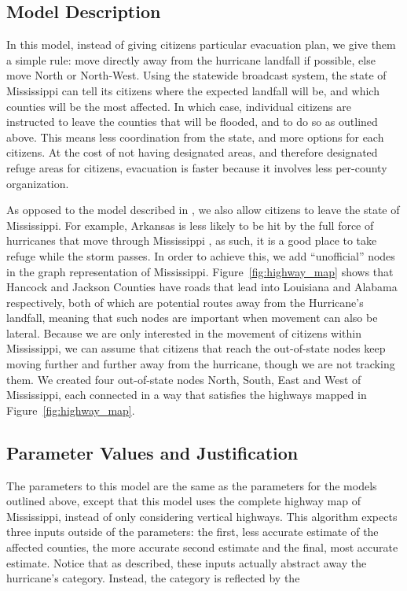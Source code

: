 \documentclass[titlepage]{article}
\begin{document}
  \subsection{Model Description}
    \par In this model, instead of giving citizens particular evacuation plan, we give them a simple rule: move directly away from the hurricane landfall if possible, else move North or North-West. Using the statewide broadcast system, the state of Mississippi can tell its citizens where the expected landfall will be, and which counties will be the most affected. In which case, individual citizens are instructed to leave the counties that will be flooded, and to do so as outlined above. This means less coordination from the state, and more options for each citizens. At the cost of not having designated areas, and therefore designated refuge areas for citizens, evacuation is faster because it involves less per-county organization.\\
    \par As opposed to the model described in , we also allow citizens to leave the state of Mississippi. For example, Arkansas is less likely to be hit by the full force of hurricanes that move through Mississippi \cite{5news}, as such, it is a good place to take refuge while the storm passes. In order to achieve this, we add ``unofficial'' nodes in the graph representation of Mississippi. Figure~\ref{fig:highway_map} shows that Hancock and Jackson Counties have roads that lead into Louisiana and Alabama respectively, both of which are potential routes away from the Hurricane's landfall, meaning that such nodes are important when movement can also be lateral. Because we are only interested in the movement of citizens within Mississippi, we can assume that citizens that reach the out-of-state nodes keep moving further and further away from the hurricane, though we are not tracking them. We created four out-of-state nodes North, South, East and West of Mississippi, each connected in a way that satisfies the highways mapped in Figure~\ref{fig:highway_map}.
  \subsection{Parameter Values and Justification}
    \par The parameters to this model are the same as the parameters for the models outlined above, except that this model uses the complete highway map of Mississippi, instead of only considering vertical highways. This algorithm expects three inputs outside of the parameters: the first, less accurate estimate of the affected counties, the more accurate second estimate and the final, most accurate estimate. Notice that as described, these inputs actually abstract away the hurricane's category. Instead, the category is reflected by the
\end{document}
